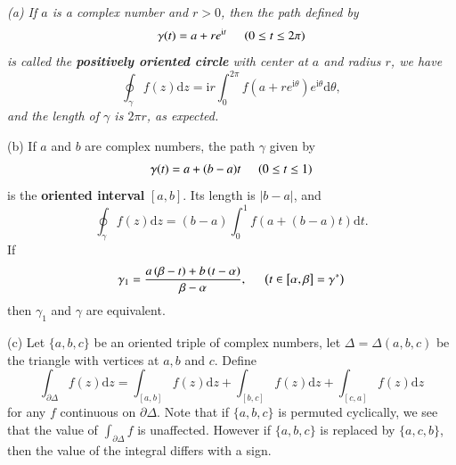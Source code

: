 \begin{example}\em
(a) If $a$ is a complex number and $r>0$, then the path defined by 
$$\gamma(t)=a+re^{\mathrm{i}t}\hspace{0.5cm}(0\le t\le 2\pi)$$
is called the \textbf{positively oriented circle} with center at $a$ and radius $r$, we have 
$$
\oint_{\gamma}{f\left( z \right) \mathrm{d}z}=\mathrm{i}r\int_0^{2\pi}{f\left( a+re^{\mathrm{i}\theta} \right) e^{\mathrm{i}\theta}\mathrm{d}\theta},
$$
and the length of $\gamma$ is $2\pi r$, as expected.\par
(b) If $a$ and $b$ are complex numbers, the path $\gamma$ given by 
$$\gamma(t)=a+(b-a)t\hspace{0.5cm}(0\le t\le 1)$$
is the \textbf{oriented interval} $[a,b]$. Its length is $|b-a|$, and 
$$
\oint_{\gamma}{f\left( z \right) \mathrm{d}z}=\left( b-a \right) \int_0^1{f\left( a+\left( b-a \right) t \right) \mathrm{d}t}.
$$
If 
$$
\gamma _1=\frac{a\left( \beta -t \right) +b\left( t-\alpha \right)}{\beta -\alpha},\hspace{0.5cm}\left( t\in \left[ \alpha ,\beta \right] =\gamma ^* \right) 
$$
then $\gamma_1$ and $\gamma$ are equivalent.\par
(c) Let $\{a,b,c\}$ be an oriented triple of complex numbers, let $\Delta=\Delta(a,b,c)$ be the triangle with vertices at $a,b$ and $c$. Define 
$$
\int_{\partial \Delta}{f\left( z \right) \mathrm{d}z}=\int_{\left[ a,b \right]}{f\left( z \right) \mathrm{d}z}+\int_{\left[ b,c \right]}{f\left( z \right) \mathrm{d}z}+\int_{\left[ c,a \right]}{f\left( z \right) \mathrm{d}z}
$$
for any $f$ continuous on $\partial\Delta$. Note that if $\{a,b,c\}$ is permuted cyclically, we see that the value of $\int_{\partial\Delta}f$ is unaffected. However if $\{a,b,c\}$ is replaced by $\{a,c,b\}$, then the value of the integral differs with a sign.
\begin{center}



\end{center}
\end{example}
